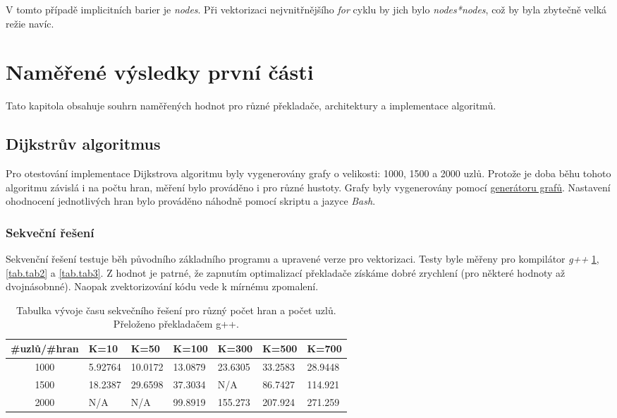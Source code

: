 \documentclass[a4paper,11pt]{article}
\begin{document}
V tomto případě implicitních barier je \textit{nodes}. Při vektorizaci nejvnitřnějšího \textit{for} 
cyklu by jich bylo
\textit{nodes*nodes}, což by byla zbytečně velká režie navíc.

\section{Naměřené výsledky první části}\label{vysledky}
Tato kapitola obsahuje souhrn naměřených hodnot pro různé překladače, architektury a implementace algoritmů.

\subsection{Dijkstrův algoritmus}
Pro otestování implementace Dijkstrova algoritmu byly vygenerovány grafy o velikosti: 1000, 1500 a 2000 uzlů.
Protože je doba běhu tohoto algoritmu závislá i na počtu hran, měření bylo prováděno i pro různé hustoty.
Grafy byly vygenerovány pomocí \href{https://edux.fit.cvut.cz/courses/MI-PDP.16/labs/zadani_semestralnich_praci/generator_grafu}{generátoru grafů}.
Nastavení ohodnocení jednotlivých hran bylo prováděno náhodně pomocí skriptu a jazyce \textit{Bash}.

 \subsubsection{Sekveční řešení}
 Sekvenční řešení testuje běh původního základního programu a upravené verze pro vektorizaci. Testy byle měřeny
 pro kompilátor \textit{g++} \ref{tab.tab1}, \ref{tab.tab2} a \ref{tab.tab3}. Z hodnot je patrné, že
 zapnutím optimalizací překladače získáme dobré zrychlení (pro některé hodnoty až dvojnásobnné). Naopak
 zvektorizování kódu vede k mírnému zpomalení.

 \begin{table}[ht]
  \begin{center}
   \begin{tabular}{|c|l|l|l|l|l|l|}
    \hline 
   \#uzlů/\#hran & K=10 & K=50 & K=100 & K=300 & K=500 & K=700\\
   \hline 
   \hline 
   1000 & 5.92764 & 10.0172 & 13.0879 & 23.6305  & 33.2583 & 28.9448\\
   \hline
    1500 & 18.2387 & 29.6598 & 37.3034 & N/A& 86.7427 & 114.921\\
    \hline
    2000 & N/A & N/A & 99.8919 & 155.273 & 207.924 & 271.259\\
    \hline
    \end{tabular}
   \caption{Tabulka vývoje času sekvečního řešení pro různý počet hran a počet uzlů. Přeloženo 
   překladačem g++.} 
   \label{tab.tab1}
  \end{center}   
  \end{table}
  
\end{document}
